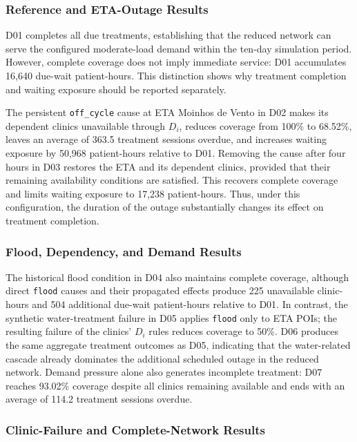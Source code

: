 \subsubsection{Reference and ETA-Outage Results}

D01 completes all due treatments, establishing that the reduced network can serve the configured moderate-load demand within the ten-day simulation period. However, complete coverage does not imply immediate service: D01 accumulates 16,640 due-wait patient-hours. This distinction shows why treatment completion and waiting exposure should be reported separately.

The persistent \texttt{off\_cycle} cause at ETA Moinhos de Vento in D02 makes its dependent clinics unavailable through $D_i$, reduces coverage from 100\% to 68.52\%, leaves an average of 363.5 treatment sessions overdue, and increases waiting exposure by 50,968 patient-hours relative to D01. Removing the cause after four hours in D03 restores the ETA and its dependent clinics, provided that their remaining availability conditions are satisfied. This recovers complete coverage and limits waiting exposure to 17,238 patient-hours. Thus, under this configuration, the duration of the outage substantially changes its effect on treatment completion.

\subsubsection{Flood, Dependency, and Demand Results}

The historical flood condition in D04 also maintains complete coverage, although direct \texttt{flood} causes and their propagated effects produce 225 unavailable clinic-hours and 504 additional due-wait patient-hours relative to D01. In contrast, the synthetic water-treatment failure in D05 applies \texttt{flood} only to ETA POIs; the resulting failure of the clinics' $D_i$ rules reduces coverage to 50\%. D06 produces the same aggregate treatment outcomes as D05, indicating that the water-related cascade already dominates the additional scheduled outage in the reduced network. Demand pressure alone also generates incomplete treatment: D07 reaches 93.02\% coverage despite all clinics remaining available and ends with an average of 114.2 treatment sessions overdue.

\subsubsection{Clinic-Failure and Complete-Network Results}

